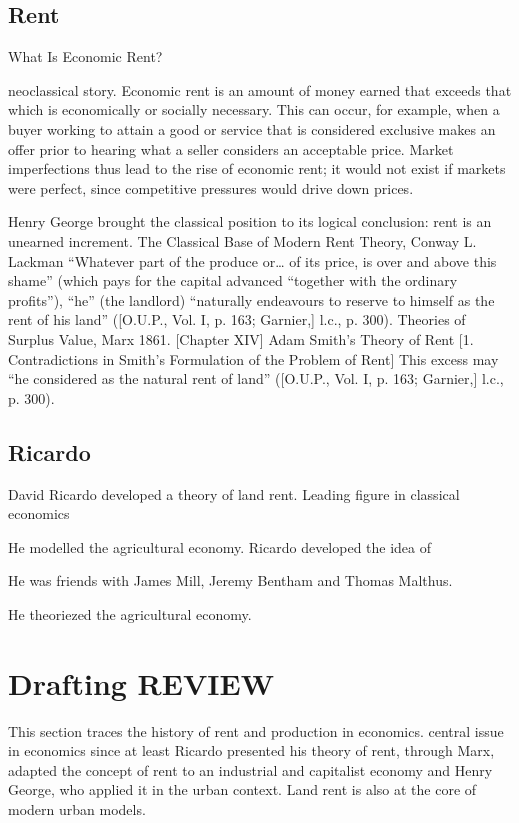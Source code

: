 \subsection{Rent}

 What Is Economic Rent?

neoclassical story.
Economic rent is an amount of money earned that exceeds that which is economically or socially necessary. This can occur, for example, when a buyer working to attain a good or service that is considered exclusive makes an offer prior to hearing what a seller considers an acceptable price. Market imperfections thus lead to the rise of economic rent; it would not exist if markets were perfect, since competitive pressures would drive down prices. 



Henry George brought the classical position to its logical conclusion: rent is an unearned increment. The Classical Base of Modern Rent Theory, Conway L. Lackman
“Whatever part of the produce or… of its price, is over and above this shame” (which pays for the capital advanced “together with the ordinary profits”), “he” (the landlord) “naturally endeavours to reserve to himself as the rent of his land” ([O.U.P., Vol. I, p. 163; Garnier,]  
l.c., p. 300). Theories of Surplus Value, Marx 1861. [Chapter XIV]  
 Adam Smith’s Theory of Rent [1.  Contradictions in Smith’s Formulation of the Problem of Rent]
This excess may “he considered as the natural rent of land” ([O.U.P., Vol. I, p. 163; Garnier,]
l.c., p. 300).


 \subsection{Ricardo}
 
 David Ricardo developed a theory of land rent.
Leading figure in classical economics



He modelled the agricultural economy.
Ricardo developed the idea of 

He was friends with James Mill, Jeremy Bentham and Thomas Malthus.

He theoriezed the agricultural economy.





\section{Drafting REVIEW}
This section traces the history of rent and production in economics.
 central issue in economics since at least Ricardo presented his theory of  rent, through Marx, adapted the concept of rent to an industrial and capitalist economy and Henry George, who applied it in the urban context. Land rent is also at the core of modern urban models.  


